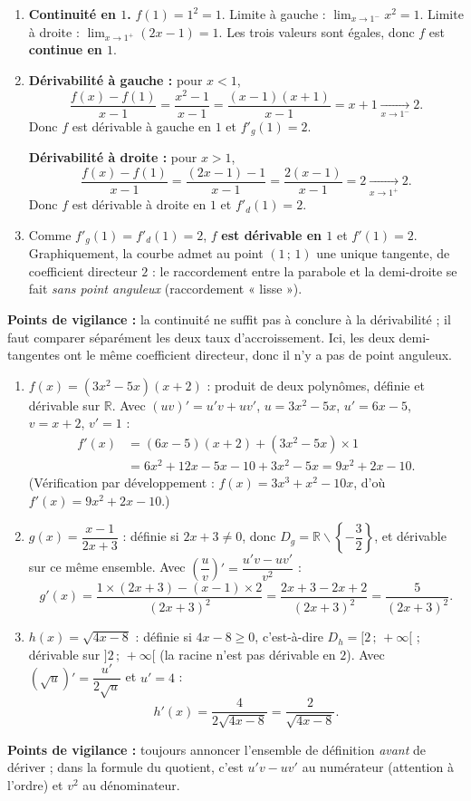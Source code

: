 \documentclass[11pt]{article}
\def\setminus{\mathbin{\backslash}}\let\smallsetminus\setminus
\begin{document}
\begin{corrige}
\begin{enumerate}
\item \textbf{Continuité en $1$.} $f(1)=1^2=1$. Limite à gauche : $\lim_{x\to 1^-}x^2=1$. Limite à droite : $\lim_{x\to 1^+}(2x-1)=1$. Les trois valeurs sont égales, donc $f$ est \textbf{continue en $1$}.
\item \textbf{Dérivabilité à gauche :} pour $x<1$,
\[ \dfrac{f(x)-f(1)}{x-1}=\dfrac{x^2-1}{x-1}=\dfrac{(x-1)(x+1)}{x-1}=x+1\xrightarrow[x\to 1^-]{}2. \]
Donc $f$ est dérivable à gauche en $1$ et $f'_g(1)=2$.

\textbf{Dérivabilité à droite :} pour $x>1$,
\[ \dfrac{f(x)-f(1)}{x-1}=\dfrac{(2x-1)-1}{x-1}=\dfrac{2(x-1)}{x-1}=2\xrightarrow[x\to 1^+]{}2. \]
Donc $f$ est dérivable à droite en $1$ et $f'_d(1)=2$.
\item Comme $f'_g(1)=f'_d(1)=2$, $f$ \textbf{est dérivable en $1$} et $f'(1)=2$. Graphiquement, la courbe admet au point $(1\,;\,1)$ une unique tangente, de coefficient directeur $2$ : le raccordement entre la parabole et la demi-droite se fait \emph{sans point anguleux} (raccordement « lisse »).
\end{enumerate}
\textbf{Points de vigilance :} la continuité ne suffit pas à conclure à la dérivabilité ; il faut comparer séparément les deux taux d'accroissement. Ici, les deux demi-tangentes ont le même coefficient directeur, donc il n'y a pas de point anguleux.
\end{corrige}

\begin{corrige}
\begin{enumerate}
\item $f(x)=(3x^2-5x)(x+2)$ : produit de deux polynômes, définie et dérivable sur $\mathbb{R}$. Avec $(uv)'=u'v+uv'$, $u=3x^2-5x$, $u'=6x-5$, $v=x+2$, $v'=1$ :
\begin{align*}
f'(x)&=(6x-5)(x+2)+(3x^2-5x)\times 1\\
&=6x^2+12x-5x-10+3x^2-5x=9x^2+2x-10.
\end{align*}
(Vérification par développement : $f(x)=3x^3+x^2-10x$, d'où $f'(x)=9x^2+2x-10$.)
\item $g(x)=\dfrac{x-1}{2x+3}$ : définie si $2x+3\neq 0$, donc $D_g=\mathbb{R}\setminus\left\{-\dfrac{3}{2}\right\}$, et dérivable sur ce même ensemble. Avec $\left(\dfrac{u}{v}\right)'=\dfrac{u'v-uv'}{v^2}$ :
\[ g'(x)=\dfrac{1\times(2x+3)-(x-1)\times 2}{(2x+3)^2}=\dfrac{2x+3-2x+2}{(2x+3)^2}=\dfrac{5}{(2x+3)^2}. \]
\item $h(x)=\sqrt{4x-8}$ : définie si $4x-8\geq 0$, c'est-à-dire $D_h=[2\,;\,+\infty[$ ; dérivable sur $]2\,;\,+\infty[$ (la racine n'est pas dérivable en $2$). Avec $(\sqrt{u})'=\dfrac{u'}{2\sqrt{u}}$ et $u'=4$ :
\[ h'(x)=\dfrac{4}{2\sqrt{4x-8}}=\dfrac{2}{\sqrt{4x-8}}. \]
\end{enumerate}
\textbf{Points de vigilance :} toujours annoncer l'ensemble de définition \emph{avant} de dériver ; dans la formule du quotient, c'est $u'v-uv'$ au numérateur (attention à l'ordre) et $v^2$ au dénominateur.
\end{corrige}
\end{document}
